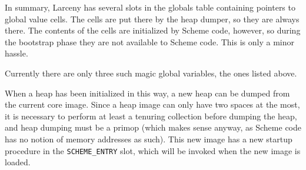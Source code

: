 In summary, Larceny has several slots in the globals table containing
pointers to global value cells. The cells are put there by the heap dumper,
so they are always there. The contents of the cells are initialized by
Scheme code, however, so during the bootstrap phase they are not available
to Scheme code.  This is only a minor hassle.

Currently there are only three such magic global variables, the ones
listed above.

When a heap has been initialized in this way, a new heap can be dumped from
the current core image. Since a heap image can only have two spaces at the
most, it is necessary to perform at least a tenuring collection before
dumping the heap, and heap dumping must be a primop (which makes sense
anyway, as Scheme code has no notion of memory addresses as such). This new
image has a new startup procedure in the {\tt SCHEME\_ENTRY} slot, which
will be invoked when the new image is loaded.

